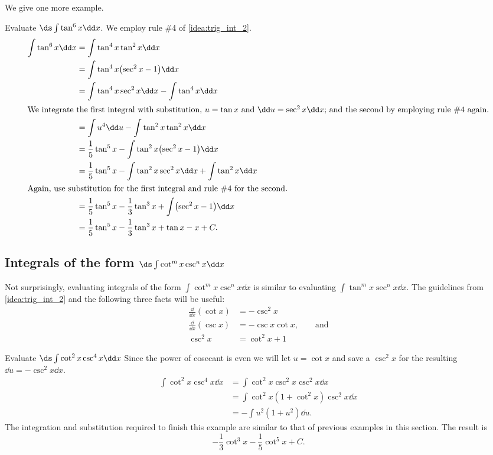 We give one more example.

\begin{example}\label{ex_trigint7}%
Evaluate $\ds\int\tan^6x\dd x$.
\solution
We employ rule \#4 of \autoref{idea:trig_int_2}. 
\begin{align*}
	\int \tan^6x\dd x
	&= \int \tan^4x\tan^2x\dd x \\
	&= \int\tan^4x\bigl(\sec^2x-1\bigr)\dd x\\
	&= \int\tan^4x\sec^2x\dd x - \int\tan^4x\dd x \\
\intertext{We integrate the first integral with substitution, $u=\tan x$ and $\dd u=\sec^2x\dd x$; and the second by employing rule \#4 again.}
	&= \int u^4\dd u-\int\tan^2 x\tan^2 x\dd x \\
	&=	\frac15\tan^5x-\int\tan^2x\bigl(\sec^2x-1\bigr)\dd x \\
	&= \frac15\tan^5x -\int\tan^2x\sec^2x\dd x + \int\tan^2x\dd x\\
\intertext{Again, use substitution for the first integral and rule \#4 for the second.}
	&= \frac15\tan^5x-\frac13\tan^3x+\int\bigl(\sec^2x-1\bigr)\dd x \\
	&=	 \frac15\tan^5x-\frac13\tan^3x+\tan x - x+C.
\end{align*}
\end{example}

\subsection{Integrals of the form \texorpdfstring{$\ds\int\cot^mx\csc^nx\dd x$}{∫(cot x)\^{}m (csc x)\^{}n dx}}

Not surprisingly, evaluating integrals of the form $\int\cot^mx\csc^nx\dd x$ is similar to evaluating $\int\tan^mx\sec^nx\dd x$. The guidelines from \autoref{idea:trig_int_2} and the following three facts will be useful:
\begin{align*}
 \frac{\dd}{\dd x}(\cot x) &= -\csc^2x \\
 \frac{\dd}{\dd x}(\csc x) &= -\csc x\cot x,\qquad\text{and} \\
 \csc^2 x &= \cot^2x+1
\end{align*}

\begin{example}\label{ex_int_cot_csc}%
Evaluate $\ds\int\cot^2x\csc^4x\dd x$
\solution
Since the power of cosecant is even we will let $u=\cot x$ and save a $\csc^2x$ for the resulting $\dd u=-\csc^2x\dd x$.
\begin{align*}
 \int\cot^2x\csc^4x\dd x
 &=\int\cot^2x\csc^2x\csc^2x\dd x \\
 &=\int\cot^2x(1+\cot^2x)\csc^2x\dd x \\
 &=-\int u^2(1+u^2)\dd u.
\end{align*}
The integration and substitution required to finish this example are similar to that of previous examples in this section. The result is
\[-\frac13\cot^3x-\frac15\cot^5x+C.\]
\end{example}


